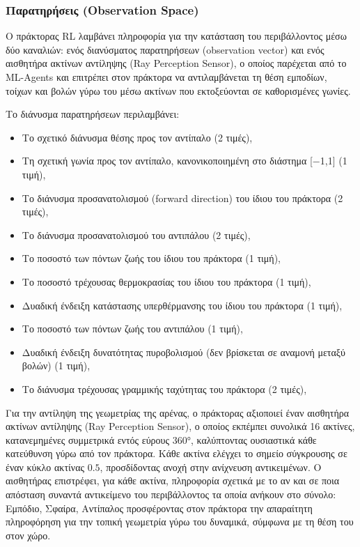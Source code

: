 \documentclass[12pt]{article}
\begin{document}
\subsubsection{Παρατηρήσεις (Observation Space)}
Ο πράκτορας RL λαμβάνει πληροφορία για την κατάσταση του περιβάλλοντος μέσω δύο καναλιών: ενός διανύσματος παρατηρήσεων (observation vector) και ενός αισθητήρα ακτίνων αντίληψης (Ray Perception Sensor), ο οποίος παρέχεται από το ML-Agents και επιτρέπει στον πράκτορα να αντιλαμβάνεται τη θέση εμποδίων, τοίχων και βολών γύρω του μέσω ακτίνων που εκτοξεύονται σε καθορισμένες γωνίες.

Το διάνυσμα παρατηρήσεων περιλαμβάνει:

\begin{itemize}
\item Το σχετικό διάνυσμα θέσης προς τον αντίπαλο (2 τιμές),
\item Τη σχετική γωνία προς τον αντίπαλο, κανονικοποιημένη στο διάστημα [−1,1] (1 τιμή),
\item Το διάνυσμα προσανατολισμού (forward direction) του ίδιου του πράκτορα (2 τιμές),
\item Το διάνυσμα προσανατολισμού του αντιπάλου (2 τιμές),
\item Το ποσοστό των πόντων ζωής του ίδιου του πράκτορα (1 τιμή),
\item Το ποσοστό τρέχουσας θερμοκρασίας του ίδιου του πράκτορα (1 τιμή),
\item Δυαδική ένδειξη κατάστασης υπερθέρμανσης του ίδιου του πράκτορα (1 τιμή),
\item Το ποσοστό των πόντων ζωής του αντιπάλου (1 τιμή),
\item Δυαδική ένδειξη δυνατότητας πυροβολισμού (δεν βρίσκεται σε αναμονή μεταξύ βολών) (1 τιμή),
\item Το διάνυσμα τρέχουσας γραμμικής ταχύτητας του πράκτορα (2 τιμές),
\end{itemize}

Για την αντίληψη της γεωμετρίας της αρένας, ο πράκτορας αξιοποιεί έναν αισθητήρα ακτίνων αντίληψης (Ray Perception Sensor), ο οποίος εκπέμπει συνολικά 16 ακτίνες, κατανεμημένες συμμετρικά εντός εύρους 360°, καλύπτοντας ουσιαστικά κάθε κατεύθυνση γύρω από τον πράκτορα. Κάθε ακτίνα ελέγχει το σημείο σύγκρουσης σε έναν κύκλο ακτίνας $0.5$, προσδίδοντας ανοχή στην ανίχνευση αντικειμένων. Ο αισθητήρας επιστρέφει, για κάθε ακτίνα, πληροφορία σχετικά με το αν και σε ποια απόσταση συναντά αντικείμενο του περιβάλλοντος τα οποία ανήκουν στο σύνολο: {Εμπόδιο, Σφαίρα, Αντίπαλος} προσφέροντας στον πράκτορα την απαραίτητη πληροφόρηση για την τοπική γεωμετρία γύρω του δυναμικά, σύμφωνα με τη θέση του στον χώρο.
\end{document}
